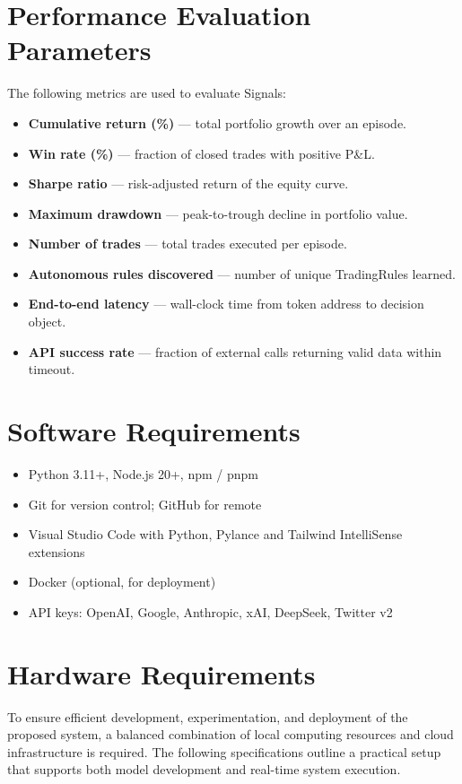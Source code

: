 \documentclass[12pt,a4paper,oneside,openany]{book}
\begin{document}
\section{Performance Evaluation Parameters}
The following metrics are used to evaluate Signals:

\begin{itemize}[leftmargin=8mm]
\item \textbf{Cumulative return (\%)} --- total portfolio growth over an episode.
\item \textbf{Win rate (\%)} --- fraction of closed trades with positive P\&L.
\item \textbf{Sharpe ratio} --- risk-adjusted return of the equity curve.
\item \textbf{Maximum drawdown} --- peak-to-trough decline in portfolio value.
\item \textbf{Number of trades} --- total trades executed per episode.
\item \textbf{Autonomous rules discovered} --- number of unique TradingRules learned.
\item \textbf{End-to-end latency} --- wall-clock time from token address to decision object.
\item \textbf{API success rate} --- fraction of external calls returning valid data within timeout.
\end{itemize}

\section{Software Requirements}
\begin{itemize}[leftmargin=8mm]
\item Python 3.11+, Node.js 20+, npm / pnpm
\item Git for version control; GitHub for remote
\item Visual Studio Code with Python, Pylance and Tailwind IntelliSense extensions
\item Docker (optional, for deployment)
\item API keys: OpenAI, Google, Anthropic, xAI, DeepSeek, Twitter v2
\end{itemize}

\section{Hardware Requirements}

To ensure efficient development, experimentation, and deployment of the proposed system, a balanced combination of local computing resources and cloud infrastructure is required. The following specifications outline a practical setup that supports both model development and real-time system execution.
\end{document}
